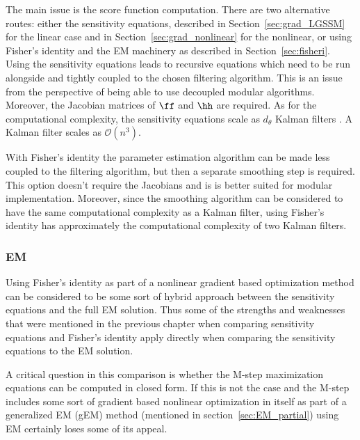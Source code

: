 The main issue is the score function computation. There are two alternative routes:
either the sensitivity equations, described in Section~\ref{sec:grad_LGSSM} for the linear
case and in Section~\ref{sec:grad_nonlinear} for the nonlinear, or using
Fisher's identity and the EM machinery as described in Section~\ref{sec:fisheri}.
Using the sensitivity equations leads to recursive equations which need
to be run alongside and tightly coupled to the chosen filtering algorithm.
This is an issue from the perspective of being able to use decoupled modular
algorithms. Moreover, the Jacobian matrices of $\ff$ and $\hh$ are required.
As for the computational complexity, the sensitivity equations scale
as $d_\theta$ Kalman filters \parencite{Cappe2005, Olsson2007}.
A Kalman filter scales as $\mathcal{O}(n^3)$. 

With Fisher's identity the parameter estimation algorithm can be made 
less coupled to the filtering algorithm, but then a separate smoothing
step is required. This option doesn't require the Jacobians and is
is better suited for modular implementation. Moreover, since
the smoothing algorithm can be considered to have the same computational
complexity as a Kalman filter, using Fisher's identity has approximately
the computational complexity of two Kalman filters.


\subsubsection*{EM}
  
Using Fisher's identity as part of a nonlinear gradient based optimization method 
can be considered to be some sort of hybrid approach between the sensitivity equations
and the full EM solution. Thus some of the strengths and weaknesses that were
mentioned in the previous chapter when comparing sensitivity equations and Fisher's identity
apply directly when comparing the sensitivity equations to the EM solution.

A critical question in this comparison is whether the M-step maximization equations
can be computed in closed form. If this is not the case and the M-step includes
some sort of gradient based nonlinear optimization in itself as part of a generalized
EM (gEM) method (mentioned in section~\ref{sec:EM_partial}) using EM certainly loses
some of its appeal. 

